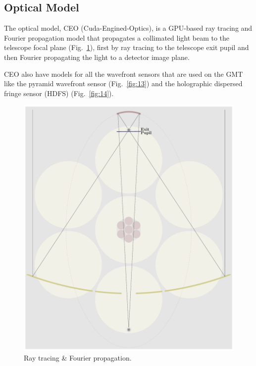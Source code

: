 \documentclass[]{AO4ELT}  %
\begin{document}
\clearpage

\subsection{Optical Model}
\label{sec:optics}

The optical model, CEO (Cuda-Engined-Optics), is a GPU-based ray tracing and Fourier propagation model that propagates a collimated light beam to the telescope focal plane (Fig.~\ref{fig:12}),
first by ray tracing to the telescope exit pupil and then Fourier propagating the light to a detector image plane.

CEO also have models for all the wavefront sensors that are used on the GMT like the pyramid wavefront sensor (Fig.~\ref{fig:13}) and the holographic dispersed fringe sensor (HDFS) (Fig.~\ref{fig:14}).


\begin{figure}
   \centering
   \includegraphics[width=0.6\linewidth]{./figures/ray_tracing.pdf}
   \caption{Ray tracing \& Fourier propagation.}
   \label{fig:12}
\end{figure}
\end{document}
